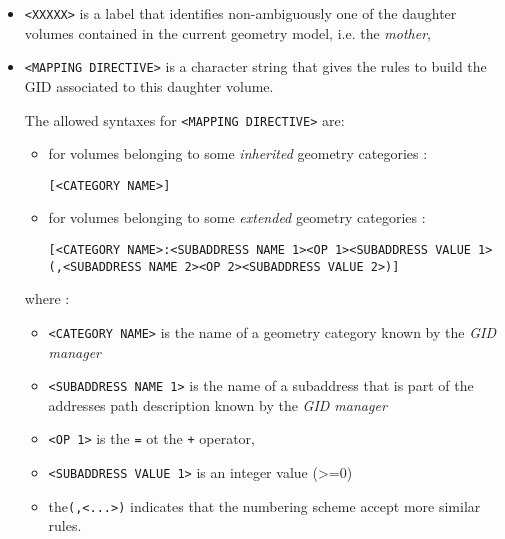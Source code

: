 \begin{itemize}

\item \texttt{<XXXXX>} is a  label that identifies non-ambiguously one
  of  the daughter volumes  contained in  the current  geometry model,
  i.e. the \emph{mother},

\item \texttt{<MAPPING  DIRECTIVE>} is  a character string  that gives
  the rules to build the GID associated to this daughter volume.
  
  The allowed syntaxes for \texttt{<MAPPING DIRECTIVE>} are:
  \begin{itemize}
  \item for volumes belonging to some \emph{inherited} geometry categories :
    \begin{center}
      \texttt{[<CATEGORY NAME>]}
    \end{center}
  \item for volumes belonging to some \emph{extended} geometry categories :
    \begin{center}
      \texttt{[<CATEGORY NAME>:<SUBADDRESS NAME 1><OP 1><SUBADDRESS VALUE 1>(,<SUBADDRESS NAME 2><OP 2><SUBADDRESS VALUE 2>)]}
    \end{center}
  \end{itemize}
  \pn where :
  \begin{itemize}
    
  \item 
    \texttt{<CATEGORY NAME>} is the  name of a geometry category known
    by the \emph{GID manager}
    
  \item
    \texttt{<SUBADDRESS NAME 1>}  is the name of a  subaddress that is
    part  of the  addresses path  description known  by  the \emph{GID
      manager}

  \item
    \texttt{<OP 1>} is the \verb+=+ ot the \verb-+- operator,

  \item
    \texttt{<SUBADDRESS VALUE 1>} is an integer value (>=0)

  \item  the\texttt{(,<...>)}  indicates  that  the  numbering  scheme
    accept more similar rules.
  \end{itemize}


\end{itemize}

